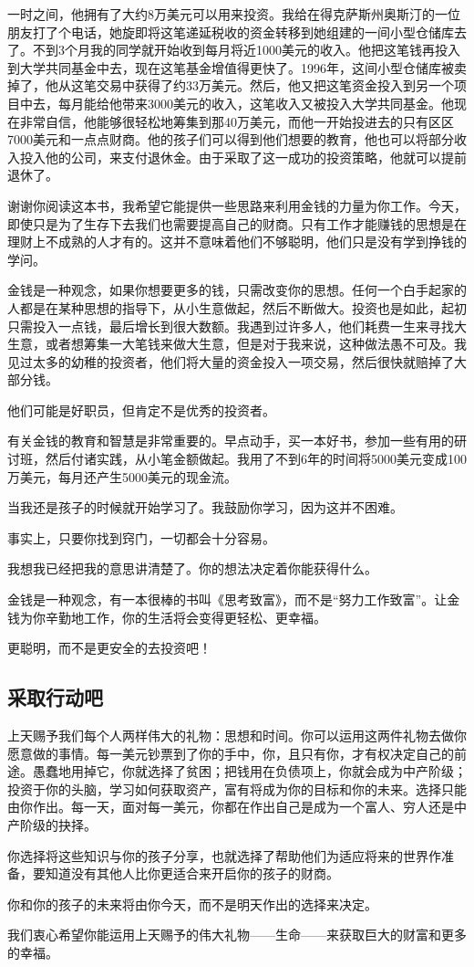 一时之间，他拥有了大约8万美元可以用来投资。我给在得克萨斯州奥斯汀的一位朋友打了个电话，她旋即将这笔递延税收的资金转移到她组建的一间小型仓储库去了。不到3个月我的同学就开始收到每月将近1000美元的收入。他把这笔钱再投入到大学共同基金中去，现在这笔基金增值得更快了。1996年，这间小型仓储库被卖掉了，他从这笔交易中获得了约33万美元。然后，他又把这笔资金投入到另一个项目中去，每月能给他带来3000美元的收入，这笔收入又被投入大学共同基金。他现在非常自信，他能够很轻松地筹集到那40万美元，而他一开始投进去的只有区区7000美元和一点点财商。他的孩子们可以得到他们想要的教育，他也可以将部分收入投入他的公司，来支付退休金。由于采取了这一成功的投资策略，他就可以提前退休了。

谢谢你阅读这本书，我希望它能提供一些思路来利用金钱的力量为你工作。今天，即使只是为了生存下去我们也需要提高自己的财商。只有工作才能赚钱的思想是在理财上不成熟的人才有的。这并不意味着他们不够聪明，他们只是没有学到挣钱的学问。

金钱是一种观念，如果你想要更多的钱，只需改变你的思想。任何一个白手起家的人都是在某种思想的指导下，从小生意做起，然后不断做大。投资也是如此，起初只需投入一点钱，最后增长到很大数额。我遇到过许多人，他们耗费一生来寻找大生意，或者想筹集一大笔钱来做大生意，但是对于我来说，这种做法愚不可及。我见过太多的幼稚的投资者，他们将大量的资金投入一项交易，然后很快就赔掉了大部分钱。

他们可能是好职员，但肯定不是优秀的投资者。

有关金钱的教育和智慧是非常重要的。早点动手，买一本好书，参加一些有用的研讨班，然后付诸实践，从小笔金额做起。我用了不到6年的时间将5000美元变成100万美元，每月还产生5000美元的现金流。

当我还是孩子的时候就开始学习了。我鼓励你学习，因为这并不困难。

事实上，只要你找到窍门，一切都会十分容易。

我想我已经把我的意思讲清楚了。你的想法决定着你能获得什么。

金钱是一种观念，有一本很棒的书叫《思考致富》，而不是“努力工作致富”。让金钱为你辛勤地工作，你的生活将会变得更轻松、更幸福。

更聪明，而不是更安全的去投资吧！

\subsection*{采取行动吧}

上天赐予我们每个人两样伟大的礼物：思想和时间。你可以运用这两件礼物去做你愿意做的事情。每一美元钞票到了你的手中，你，且只有你，才有权决定自己的前途。愚蠢地用掉它，你就选择了贫困；把钱用在负债项上，你就会成为中产阶级；投资于你的头脑，学习如何获取资产，富有将成为你的目标和你的未来。选择只能由你作出。每一天，面对每一美元，你都在作出自己是成为一个富人、穷人还是中产阶级的抉择。

你选择将这些知识与你的孩子分享，也就选择了帮助他们为适应将来的世界作准备，要知道没有其他人比你更适合来开启你的孩子的财商。

你和你的孩子的未来将由你今天，而不是明天作出的选择来决定。

我们衷心希望你能运用上天赐予的伟大礼物——生命——来获取巨大的财富和更多的幸福。


